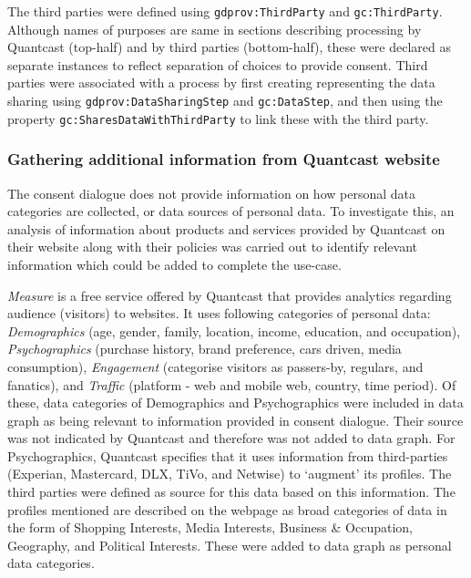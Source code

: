 The third parties were defined using \texttt{gdprov:ThirdParty} and \texttt{gc:ThirdParty}.
Although names of purposes are same in sections describing processing by Quantcast (top-half) and by third parties (bottom-half), these were declared as separate instances to reflect separation of choices to provide consent.
Third parties were associated with a process by first creating representing the data sharing using \texttt{gdprov:DataSharingStep} and \texttt{gc:DataStep}, and then using the property \texttt{gc:SharesDataWithThirdParty} to link these with the third party.

\subsubsection{Gathering additional information from Quantcast website}
The consent dialogue does not provide information on how personal data categories are collected, or data sources of personal data. To investigate this, an analysis of information about products and services provided by Quantcast on their website along with their policies was carried out to identify relevant information which could be added to complete the use-case.

\textit{Measure} is a free service offered by Quantcast that provides analytics regarding audience (visitors) to websites. It uses following categories of personal data: \textit{Demographics} (age, gender, family, location, income, education, and occupation), \textit{Psychographics} (purchase history, brand preference, cars driven, media consumption), \textit{Engagement} (categorise visitors as passers-by, regulars, and fanatics), and \textit{Traffic} (platform - web and mobile web, country, time period). Of these, data categories of Demographics and Psychographics were included in data graph as being relevant to information provided in consent dialogue. Their source was not indicated by Quantcast and therefore was not added to  data graph.
For Psychographics, Quantcast specifies that it uses information from third-parties (Experian, Mastercard, DLX, TiVo, and Netwise) to `augment' its profiles. The third parties were defined as source for this data based on this information.
The profiles mentioned are described on the webpage as broad categories of data in the form of Shopping Interests, Media Interests, Business \& Occupation, Geography, and Political Interests. These were added to data graph as personal data categories.


